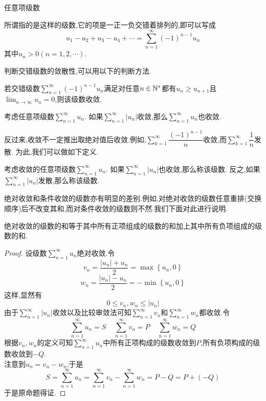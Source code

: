 \documentclass{ctexart}
\begin{document}
\pagestyle{empty}
\begin{center}\large 任意项级数\end{center}
\begin{definition}[1.1 定义:交错级数]
    所谓指的是这样的级数,它的项是一正一负交错着排列的,即可以写成
    \[u_1-u_2+u_3-u_4+\cdots=\sum_{n=1}^{\infty}\left(-1\right)^{n-1}u_n\]
    其中$u_n>0(n=1,2,\cdots)$.
\end{definition}\noindent
判断交错级数的敛散性,可以用以下的判断方法.
\begin{formal}[1.2 莱布尼茨判别法]
    若交错级数$\displaystyle\sum_{n=1}^{\infty}\left(-1\right)^{n-1}u_n$满足对任意$n\in\mathbb{N}^*$都有$u_n\geqslant u_{n+1}$且%
    $\displaystyle\lim_{n\to\infty}u_n=0$,则该级数收敛.
\end{formal}\noindent
{}
\begin{formal}[2.1 绝对值收敛推出收敛]
    考虑任意项级数$\displaystyle\sum_{n=1}^{\infty}u_n$.%
    如果$\displaystyle\sum_{n=1}^{\infty}\left|u_n\right|$收敛,那么$\displaystyle\sum_{n=1}^{\infty}u_n$也收敛.
\end{formal}\noindent
反过来,收敛不一定推出取绝对值后收敛.例如,$\displaystyle\sum_{k=1}^{\infty}\dfrac{(-1)^{n-1}}{n}$收敛,而$\displaystyle\sum_{k=1}^\infty\dfrac1n$发散.%
为此,我们可以做如下定义.
\begin{definition}[2.2 绝对收敛与条件收敛]
    考虑收敛的任意项级数$\displaystyle\sum_{n=1}^{\infty}u_n$.%
    如果$\displaystyle\sum_{n=1}^{\infty}\left|u_n\right|$也收敛,那么称该级数.%
    反之,如果$\displaystyle\sum_{n=1}^{\infty}\left|u_n\right|$发散,那么称该级数.
\end{definition}\noindent
绝对收敛和条件收敛的级数亦有明显的差别.例如,对绝对收敛的级数任意重排(交换顺序)后不改变其和,而对条件收敛的级数则不然.我们下面对此进行说明.
\begin{formal}[2.3 绝对收敛的级数的和]
    绝对收敛的级数的和等于其中所有正项组成的级数的和加上其中所有负项组成的级数的和.
\end{formal}
\begin{proof}
    设级数$\displaystyle\sum_{n=1}^{\infty}u_n$绝对收敛.令
    \[v_n=\dfrac{\left|u_n\right|+u_n}{2}=\max\left\{u_n,0\right\}\]
    \[w_n=\dfrac{\left|u_n\right|-u_n}{2}=-\min\left\{u_n,0\right\}\]
    这样,显然有
    \[0\leqslant v_n,w_n\leqslant\left|u_n\right|\]
    由于$\displaystyle\sum_{n=1}^{\infty}\left|u_n\right|$收敛以及比较审敛法可知$\displaystyle\sum_{n=1}^{\infty}v_n$和$\displaystyle\sum_{n=1}^{\infty}w_n$都收敛.令
    \[\sum_{n=1}^{\infty}u_n=S\ \ \ \ \ \sum_{n=1}^{\infty}v_n=P\ \ \ \ \ \sum_{n=1}^{\infty}w_n=Q\]
    根据$v_n,w_n$的定义可知$\displaystyle\sum_{n=1}^{\infty}u_n$中所有正项构成的级数收敛到$P$,所有负项构成的级数收敛到$-Q$.\\
    注意到$u_n=v_n-w_n$,于是
    \[S=\sum_{n=1}^{\infty}u_n=\sum_{n=1}^{\infty}v_n-\sum_{n=1}^{\infty}w_n=P-Q=P+(-Q)\]
    于是原命题得证.
\end{proof}
\end{document}
